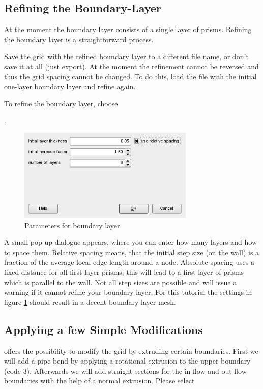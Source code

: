 \clearpage
\subsection{Refining the Boundary-Layer}
At the moment the boundary layer consists of a single layer of prisms. Refining the boundary layer is a straightforward process. 

\important
{
  Save the grid with the refined boundary layer to
  a different file name, or don't save it at all (just export). At the
  moment the refinement cannot be reversed and thus the grid spacing
  cannot be changed. To do this, load the file with the initial one-layer
  boundary layer and refine again.
}

To refine the boundary layer, choose

.
\begin{figure}
  \begin{centering}
    \includegraphics[width=84mm]{figures/tutorials/T1/scr05}
    \par
  \end{centering}
  \caption{Parameters for boundary layer}
  \label{fig:T1_scr05}
\end{figure}

A small pop-up dialogue appears, where you can enter how many layers and how to space them. Relative spacing means, that the initial step size (on the wall) is a fraction of the average local edge length around a node. Absolute spacing uses a fixed distance for all first layer prisms; this will lead to a first layer of prisms which is parallel to the wall. Not all step sizes are possible and \eg will issue a warning if it cannot refine your boundary layer. For this tutorial the settings in figure \ref{fig:T1_scr05} should result in a decent boundary layer mesh.

\clearpage
\subsection{Applying a few Simple Modifications}
\eg offers the possibility to modify the grid by extruding certain boundaries. First we will add a pipe bend by applying a rotational extrusion to the upper boundary (code 3). Afterwards we will add straight sections for the in-flow and out-flow boundaries with the help of a normal extrusion. Please select

